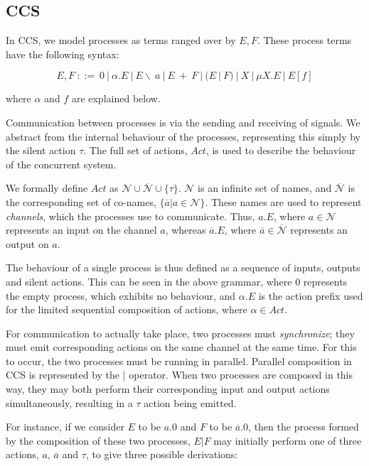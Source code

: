 \subsection{CCS}

In CCS, we model processes as terms ranged over by $E, F$.  These
process terms have the following syntax:

\begin{equation}
  E, F\ ::=\ 
  0\ |\ 
  \alpha.E\ |\ 
  E\backslash\ a\ |\ 
  E\ +\ F\ |\ 
  (E\ |\ F)\ |\ 
  X\ |\ 
  \mu X.E\ |\ 
  E[f] 
\end{equation}

\noindent where $\alpha$ and $f$ are explained below.

Communication between processes is via the sending and receiving of
signals.  We abstract from the internal behaviour of the processes,
representing this simply by the silent action $\tau$.  The full set of
actions, $Act$, is used to describe the behaviour of the concurrent
system.

We formally define $Act$ as $\mathcal{N} \cup \overline{\mathcal{N}}
\cup \{\tau\}$.  $\mathcal{N}$ is an infinite set of names, and
$\overline{\mathcal{N}}$ is the corresponding set of co-names,
$\{\overline{a} | a \in \mathcal{N}\}$.  These names are used to
represent \emph{channels}, which the processes use to communicate.
Thus, $a.E$, where $a \in \mathcal{N}$ represents an input on the
channel $a$, whereas $\overline{a}.E$, where $\overline{a} \in
\overline{\mathcal{N}}$ represents an output on $a$.  

The behaviour of a single process is thus defined as a sequence of
inputs, outputs and silent actions. This can be seen in the above
grammar, where $0$ represents the empty process, which exhibits no
behaviour, and $\alpha.E$ is the action prefix used for the limited
sequential composition of actions, where $\alpha \in Act$.

For communication to actually take place, two processes must
\emph{synchronize}; they must emit corresponding actions on the same
channel at the same time.  For this to occur, the two processes must be
running in parallel.  Parallel composition in CCS is represented by the
$|$ operator.  When two processes are composed in this way, they may
both perform their corresponding input and output actions
simultaneously, resulting in a $\tau$ action being emitted.

For instance, if we consider $E$ to be $a.0$ and $F$ to be
$\overline{a}.0$, then the process formed by the composition of these
two processes, $E|F$ may initially perform one of three actions, $a$,
$\overline{a}$ and $\tau$, to give three possible derivations:


